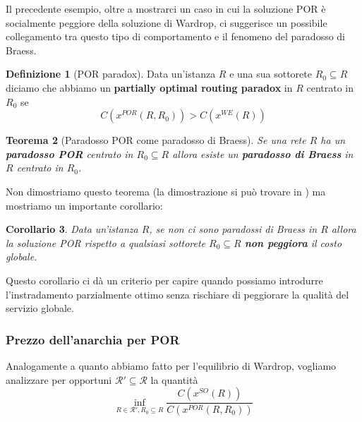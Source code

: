 \documentclass[a4paper]{article}
\theoremstyle{plain}
\newtheorem{myteo}{Teorema}[section]
\newtheorem{mycor}[myteo]{Corollario}
\theoremstyle{definition}
\newtheorem{mydef}[myteo]{Definizione}
\theoremstyle{remark}
\newcommand{\pa}[1]{\left(#1\right)}
\begin{document}
Il precedente esempio, oltre a mostrarci un caso in cui la soluzione
POR è socialmente peggiore della soluzione di Wardrop, ci suggerisce
un possibile collegamento tra questo tipo di comportamento e il
fenomeno del paradosso di Braess.

\begin{mydef}[POR paradox]
  Data un'istanza $R$ e una sua sottorete $R_0 \subseteq R$ diciamo
  che abbiamo un \textbf{partially optimal routing paradox} in $R$
  centrato in $R_0$ se 
  \[ C\pa{ x^{POR} (R,R_0)} > C\pa{ x^{WE} (R)} \]
\end{mydef}

\begin{myteo}[Paradosso POR come paradosso di Braess]
  Se una rete $R$ ha un \textbf{paradosso POR} centrato in
  $R_0\subseteq R$ allora esiste un \textbf{paradosso di Braess} in
  $R$ centrato in $R_0$.
\end{myteo}

Non dimostriamo questo teorema (la dimostrazione si può trovare in
\cite[Proposizione 1]{acemoglu2007}) ma mostriamo un importante
corollario:
\begin{mycor}
  Data un'istanza $R$, se non ci sono paradossi di Braess in $R$
  allora la soluzione POR rispetto a qualsiasi sottorete
  $R_0 \subseteq R$ \textbf{non peggiora} il costo globale.
\end{mycor}

Questo corollario ci dà un criterio per capire quando possiamo
introdurre l'instradamento parzialmente ottimo senza rischiare di
peggiorare la qualità del servizio globale.

\subsubsection{Prezzo dell'anarchia per POR}
\label{sec:poa-por}

Analogamente a quanto abbiamo fatto per l'equilibrio di Wardrop,
vogliamo analizzare per opportuni $\mathcal{R}' \subseteq \mathcal{R}$
la quantità
\[ \inf _{R \in \mathcal{R}', R_0 \subseteq R}
  \frac{C\pa{x^{SO}\pa{R}}}{C\pa{x^{POR}\pa{R,R_0}}} \]
\end{document}
